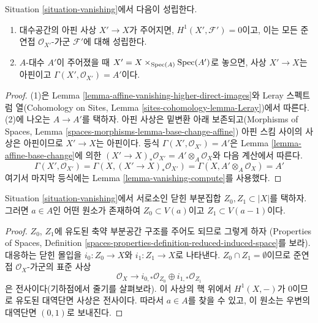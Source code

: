 \begin{lemma}
\label{lemma-vanishing-base-change}
Situation \ref{situation-vanishing}에서 다음이 성립한다.
\begin{enumerate}
\item 대수공간의 아핀 사상 $X' \to X$가 주어지면,
$H^1(X', \mathcal{F}') = 0$이고, 이는 모든 준연접
$\mathcal{O}_{X'}$-가군 $\mathcal{F}'$에 대해 성립한다.
\item $A$-대수 $A'$이 주어졌을 때
$X' = X \times_{\mathop{\mathrm{Spec}}(A)} \mathop{\mathrm{Spec}}(A')$로 놓으면, 사상 $X' \to X$는
아핀이고 $\Gamma(X', \mathcal{O}_{X'}) = A'$이다.
\end{enumerate}
\end{lemma}

\begin{proof}
(1)은 Lemma \ref{lemma-affine-vanishing-higher-direct-images}와 Leray
스펙트럼 열(Cohomology on Sites, Lemma
\ref{sites-cohomology-lemma-Leray})에서 따른다. (2)에 나오는
$A \to A'$를 택하자. 아핀 사상은 밑변환 아래 보존되고(Morphisms of
Spaces, Lemma \ref{spaces-morphisms-lemma-base-change-affine}) 아핀 스킴
사이의 사상은 아핀이므로 $X' \to X$는 아핀이다. 등식
$\Gamma(X', \mathcal{O}_{X'}) = A'$은 Lemma
\ref{lemma-affine-base-change}에 의한
$(X' \to X)_*\mathcal{O}_{X'} = A' \otimes_A \mathcal{O}_X$와
다음 계산에서 따른다.
$$
\Gamma(X', \mathcal{O}_{X'}) =
\Gamma(X, (X' \to X)_*\mathcal{O}_{X'}) =
\Gamma(X, A' \otimes_A \mathcal{O}_X) = A'
$$
여기서 마지막 등식에는 Lemma \ref{lemma-vanishing-compute}를 사용했다.
\end{proof}

\begin{lemma}
\label{lemma-vanishing-separate-closed}
Situation \ref{situation-vanishing}에서 서로소인 닫힌 부분집합
$Z_0, Z_1 \subset |X|$를 택하자. 그러면 $a \in A$인 어떤 원소가
존재하여 $Z_0 \subset V(a)$이고 $Z_1 \subset V(a - 1)$이다.
\end{lemma}

\begin{proof}
$Z_0$, $Z_1$에 유도된 축약 부분공간 구조를 주어도 되므로 그렇게 하자
(Properties of Spaces, Definition
\ref{spaces-properties-definition-reduced-induced-space}를 보라).
대응하는 닫힌 몰입을 $i_0 : Z_0 \to X$와
$i_1 : Z_1 \to X$로 나타낸다. $Z_0 \cap Z_1 = \emptyset$이므로 준연접
$\mathcal{O}_X$-가군의 표준 사상
$$
\mathcal{O}_X
\longrightarrow
i_{0, *}\mathcal{O}_{Z_0} \oplus i_{1, *}\mathcal{O}_{Z_1}
$$
은 전사이다(기하점에서 줄기를 살펴보라). 이 사상의 핵 위에서
$H^1(X, -)$가 0이므로 유도된 대역단면 사상은 전사이다. 따라서
$a \in A$를 찾을 수 있고, 이 원소는 우변의 대역단면 $(0, 1)$로 보내진다.
\end{proof}

